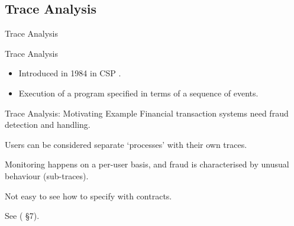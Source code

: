 \documentclass[12pt]{beamer}
\begin{document}

\subsection{Trace Analysis}
\label{sec:runver-trace}

\begin{frame}
  \begin{center}
    \Large Trace Analysis
  \end{center}
\end{frame}

\begin{frame}{Trace Analysis}


  \begin{itemize}
    \item Introduced in 1984 in CSP \parencite{cspthy}.
    \item Execution of a program specified in terms of a sequence of events.
  \end{itemize}

\end{frame}

\begin{frame}{Trace Analysis: \small Motivating Example}
  Financial transaction systems need fraud detection and handling.

  \vspace{0.25cm}

  Users can be considered separate `processes' with their own traces.

  \vspace{0.25cm}

  Monitoring happens on a per-user basis, and fraud is characterised
  by unusual behaviour (sub-traces).

  \vspace{0.25cm}

  Not easy to see how to specify with contracts.

  \vspace{0.25cm}

  See (\cite{compensate} \S7).

\end{frame}
\end{document}
